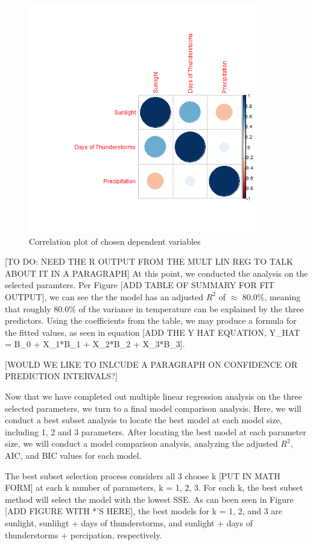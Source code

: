 \begin{figure}
  \centering
  \includegraphics[width=10cm]{../data/img/correlation_plot.PNG}
  \caption{Correlation plot of chosen dependent variables}
  \label{fig:correlation_plot}
\end{figure}

[TO DO: NEED THE R OUTPUT FROM THE MULT LIN REG TO TALK ABOUT IT IN A PARAGRAPH] At this point, we conducted the analysis on the selected paramters. Per Figure [ADD TABLE OF SUMMARY FOR FIT OUTPUT], we can see the the model has an adjusted $R^{2}$ of $\approx$ 80.0\%, meaning that roughly 80.0\% of the variance in temperature can be explained by the three predictors. Using the coefficients from the table, we may produce a formula for the fitted values, as seen in equation [ADD THE Y HAT EQUATION, Y\_HAT = B\_0 + X\_1*B\_1 + X\_2*B\_2 + X\_3*B\_3].

[WOULD WE LIKE TO INLCUDE A PARAGRAPH ON CONFIDENCE OR PREDICTION INTERVALS?]

Now that we have completed out multiple linear regression analysis on the three selected parameters, we turn to a final model comparison analysis. Here, we will conduct a best subset analysis to locate the best model at each model size, including 1, 2 and 3 parameters. After locating the best model at each parameter size, we will conduct a model comparison analysis, analyzing the adjusted $R^{2}$, AIC, and BIC values for each model.

The best subset selection process considers all 3 choose k [PUT IN MATH FORM] at each k number of parameters, k = 1, 2, 3. For each k, the best subset method will select the model with the lowest SSE. As can been seen in Figure [ADD FIGURE WITH *'S HERE], the best models for k = 1, 2, and 3 are sunlight, sunlihgt + days of thunderstorms, and sunlight + days of thunderstorms + percipation, respectively.

